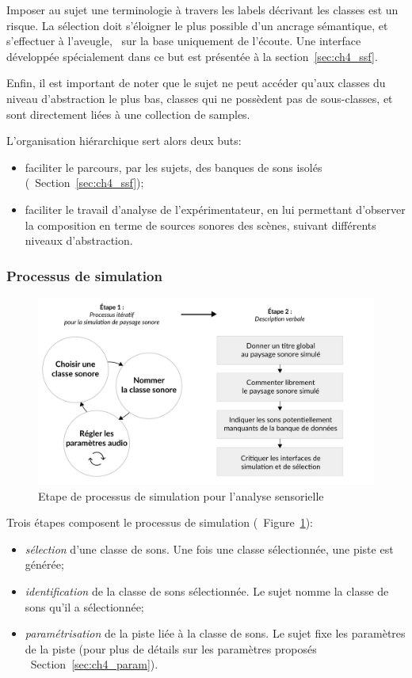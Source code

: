 Imposer au sujet une terminologie à travers les labels décrivant les classes est un risque. La sélection doit s'éloigner le plus possible d'un ancrage sémantique, et s'effectuer à l'aveugle, \ie~sur la base uniquement de l'écoute. Une interface développée spécialement dans ce but est présentée à la section~\ref{sec:ch4_ssf}.

Enfin, il est important de noter que le sujet ne peut accéder qu'aux classes du niveau d'abstraction le plus bas, classes qui ne possèdent pas de sous-classes, et sont directement liées à une collection de samples.

L’organisation hiérarchique sert alors deux buts:

\begin{itemize}
\item faciliter le parcours, par les sujets, des banques de sons isolés (\cf~Section~\ref{sec:ch4_ssf});
\item faciliter le travail d'analyse de l'expérimentateur, en lui permettant d'observer la composition en terme de sources sonores des scènes, suivant différents niveaux d'abstraction.
\end{itemize}

\subsubsection{Processus de simulation}
\label{sec:ch4_processSimu}

\begin{figure}[t]
        \myfloatalign
        \includegraphics[width=.8\linewidth]{gfx/ch_4/4}
       \caption{Etape de processus de simulation pour l'analyse sensorielle}\label{fig:etapeSimu}
\end{figure}

Trois étapes composent le processus de simulation (\cf~Figure~\ref{fig:etapeSimu}):

\begin{itemize}
\item \emph{sélection} d'une classe de sons. Une fois une classe sélectionnée, une piste est générée; 
\item \emph{identification} de la classe de sons sélectionnée. Le sujet nomme la classe de sons qu'il a sélectionnée;
\item \emph{paramétrisation} de la piste liée à la classe de sons. Le sujet fixe les paramètres de la piste (pour plus de détails sur les paramètres proposés \cf~Section~\ref{sec:ch4_param}).
\end{itemize}

